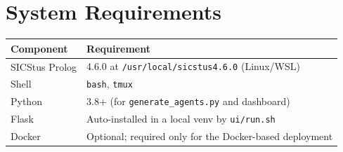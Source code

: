 \section{System Requirements}

\begin{longtable}{@{} l l @{}}
\toprule
\textbf{Component} & \textbf{Requirement} \\
\midrule
\endhead
SICStus Prolog & 4.6.0 at \texttt{/usr/local/sicstus4.6.0} (Linux/WSL) \\
Shell           & \texttt{bash}, \texttt{tmux} \\
Python          & 3.8+ (for \texttt{generate\_agents.py} and dashboard) \\
Flask           & Auto-installed in a local venv by \texttt{ui/run.sh} \\
Docker          & Optional; required only for the Docker-based deployment \\
\bottomrule
\end{longtable}
